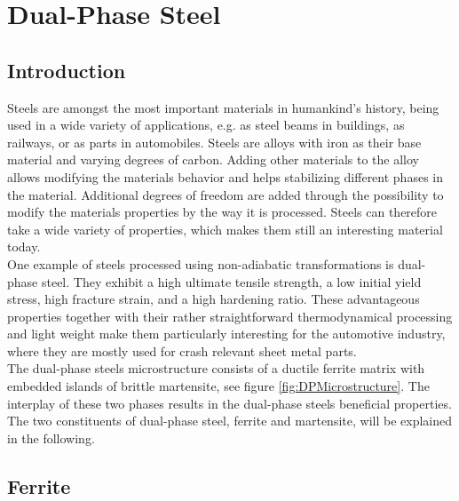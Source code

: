 \chapter{Dual-Phase Steel}
\label{cha:DualPhaseSteels}

\section{Introduction}

Steels are amongst the most important materials in humankind's history, being used in a wide variety of applications, e.g. as steel beams in buildings, as railways, or as parts in automobiles. Steels are alloys with iron as their base material and varying degrees of carbon. Adding other materials to the alloy allows modifying the materials behavior and helps stabilizing different phases in the material. Additional degrees of freedom are added through the possibility to modify the materials properties by the way it is processed. Steels can therefore take a wide variety of properties, which makes them still an interesting material today. \\


One example of steels processed using non-adiabatic transformations is dual-phase steel. They exhibit a high ultimate tensile strength, a low initial yield stress, high fracture strain, and a high hardening ratio. These advantageous properties together with their rather straightforward thermodynamical processing and light weight make them particularly interesting for the automotive industry, where they are mostly used for crash relevant sheet metal parts. \\

The dual-phase steels microstructure consists of a ductile ferrite matrix with embedded islands of brittle martensite, see figure \ref{fig:DPMicrostructure}. The interplay of these two phases results in the dual-phase steels beneficial properties. The two constituents of dual-phase steel, ferrite and martensite, will be explained in the following. \\

\section{Ferrite}

